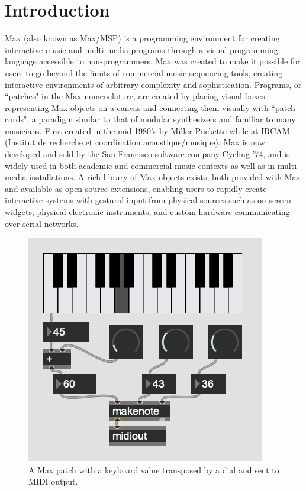 \documentclass[acmsmall]{acmart}
\begin{document}

\maketitle

\section{Introduction}

Max (also known as Max/MSP) is a programming environment for creating interactive 
music and multi-media programs through a visual programming language accessible 
to non-programmers. Max was created to make it possible for users
to go beyond the limits of commercial music sequencing tools, creating
interactive environments of arbitrary complexity and sophistication.
\cite{Zicarelli2002}
Programs, or ``patches" in the Max nomenclature, are created by placing
visual boxes representing Max objects on a canvas and connecting them visually with
``patch cords", a paradigm similar to that of modular synthesizers and familiar to many musicians.
First created in the mid 1980's by Miller Puckette while at IRCAM 
(Institut de recherche et coordination acoustique/musique), 
Max is now developed and sold by the San Francisco software company Cycling '74,
and is widely used in both academic and commercial music contexts as well
as in multi-media installations. A rich library of Max objects exists, 
both provided with Max and available as open-source 
extensions, enabling users to rapidly create interactive systems with gestural 
input from physical sources such as on screen widgets, physical electronic instruments,
and custom hardware communicating over serial networks.

\begin{figure}[h]
  \centering
  \includegraphics[width=.5\linewidth]{fig-1}
  \caption{A Max patch with a keyboard value transposed by a dial and sent to MIDI output.}
  \Description{}
\end{figure}
\end{document}
